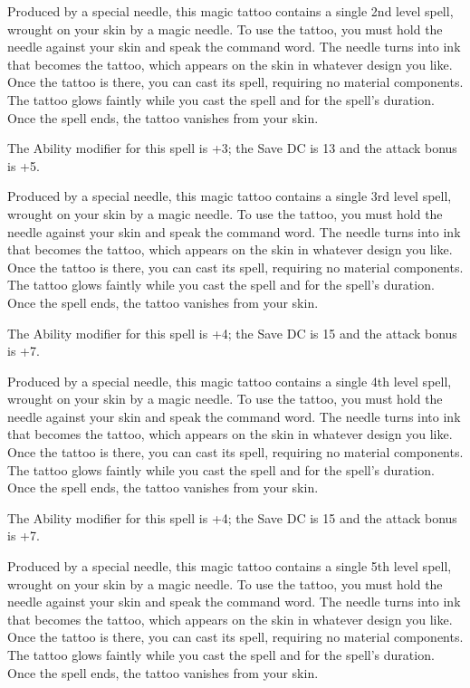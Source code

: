 \documentclass[10pt,a4paper,twoside,bg=print,twocolumn,openany,nodeprecatedcode]{dndbook}
\begin{document}
Produced by a special needle, this magic tattoo contains a single 2nd level spell, wrought on your skin by a magic needle. To use the tattoo, you must hold the needle against your skin and speak the command word. The needle turns into ink that becomes the tattoo, which appears on the skin in whatever design you like. Once the tattoo is there, you can cast its spell, requiring no material components. The tattoo glows faintly while you cast the spell and for the spell's duration. Once the spell ends, the tattoo vanishes from your skin.

The Ability modifier for this spell is +3; the Save DC is 13 and the attack bonus is +5.

Produced by a special needle, this magic tattoo contains a single 3rd level spell, wrought on your skin by a magic needle. To use the tattoo, you must hold the needle against your skin and speak the command word. The needle turns into ink that becomes the tattoo, which appears on the skin in whatever design you like. Once the tattoo is there, you can cast its spell, requiring no material components. The tattoo glows faintly while you cast the spell and for the spell's duration. Once the spell ends, the tattoo vanishes from your skin.

The Ability modifier for this spell is +4; the Save DC is 15 and the attack bonus is +7.

Produced by a special needle, this magic tattoo contains a single 4th level spell, wrought on your skin by a magic needle. To use the tattoo, you must hold the needle against your skin and speak the command word. The needle turns into ink that becomes the tattoo, which appears on the skin in whatever design you like. Once the tattoo is there, you can cast its spell, requiring no material components. The tattoo glows faintly while you cast the spell and for the spell's duration. Once the spell ends, the tattoo vanishes from your skin.

The Ability modifier for this spell is +4; the Save DC is 15 and the attack bonus is +7.

Produced by a special needle, this magic tattoo contains a single 5th level spell, wrought on your skin by a magic needle. To use the tattoo, you must hold the needle against your skin and speak the command word. The needle turns into ink that becomes the tattoo, which appears on the skin in whatever design you like. Once the tattoo is there, you can cast its spell, requiring no material components. The tattoo glows faintly while you cast the spell and for the spell's duration. Once the spell ends, the tattoo vanishes from your skin.
\end{document}
